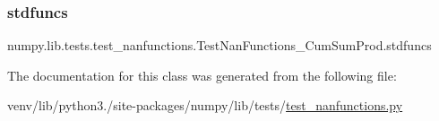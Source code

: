 \subsubsection{\texorpdfstring{stdfuncs}{stdfuncs}}
{\footnotesize\ttfamily numpy.\+lib.\+tests.\+test\+\_\+nanfunctions.\+Test\+Nan\+Functions\+\_\+\+Cum\+Sum\+Prod.\+stdfuncs\hspace{0.3cm}{\ttfamily [static]}}



The documentation for this class was generated from the following file\+:\begin{DoxyCompactItemize}
\item 
venv/lib/python3./site-\/packages/numpy/lib/tests/\hyperlink{test__nanfunctions_8py}{test\+\_\+nanfunctions.\+py}\end{DoxyCompactItemize}
